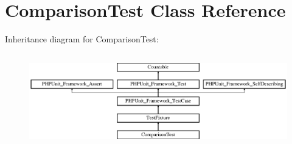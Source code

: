 \section{Comparison\+Test Class Reference}
\label{class_comparison_test}
Inheritance diagram for Comparison\+Test\+:\begin{figure}[H]
\begin{center}
\leavevmode
\includegraphics[height=4.129793cm]{class_comparison_test}
\end{center}
\end{figure}
